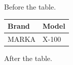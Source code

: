 \documentclass[11pt,a4paper]{article}
\begin{document}
Before the table.

\begin{table}[h]
\begin{tabular}{|l|l|}
\hline
Brand & Model \\ \hline
MARKA & X-100 \\ \hline
\end{tabular}
\end{table}

After the table.
\end{document}
